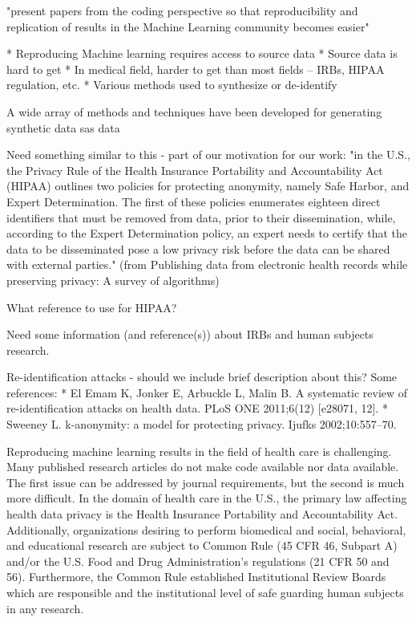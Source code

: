 "present papers from the coding perspective so that reproducibility and replication of results in the Machine Learning community becomes easier"

* Reproducing Machine learning requires access to source data
* Source data is hard to get
* In medical field, harder to get than most fields – IRBs, HIPAA regulation, etc.
* Various methods used to synthesize or de-identify

A wide array of methods and techniques have been developed for generating synthetic data sas  data \cite{walonoski_synthea:_2018}

Need something similar to this - part of our motivation for our work:
"in the U.S., the Privacy Rule of the Health Insurance Portability and Accountability Act (HIPAA)  outlines two policies for protecting anonymity, namely Safe Harbor, and Expert Determination. The first of these policies enumerates eighteen direct identifiers that must be removed from data, prior to their dissemination, while, according to the Expert Determination policy, an expert needs to certify that the data to be disseminated pose a low privacy risk before the data can be shared with external parties." (from Publishing data from electronic health records while preserving privacy: A survey of algorithms)

What reference to use for HIPAA? \cite{hippapro}

Need some information (and reference(s)) about IRBs and human subjects research. 

Re-identification attacks - should we include brief description about this? Some references: 
* El Emam K, Jonker E, Arbuckle L, Malin B. A systematic review of re-identification attacks on health data. PLoS ONE 2011;6(12) [e28071, 12].
* Sweeney L. k-anonymity: a model for protecting privacy. Ijufks 2002;10:557–70.

Reproducing machine learning results in the field of health care is challenging. Many published research articles do not make code available nor data available. The first issue can be addressed by journal requirements, but the second is much more difficult. In the domain of health care in the U.S., the primary law affecting health data privacy is the Health Insurance Portability and Accountability Act. Additionally, organizations desiring to perform biomedical and social, behavioral, and educational research are subject to Common Rule (45 CFR 46, Subpart A) and/or the U.S. Food and Drug Administration’s regulations (21 CFR 50 and 56). Furthermore, the Common Rule established Institutional Review Boards which are responsible and the institutional level of safe guarding human subjects in any research. 


